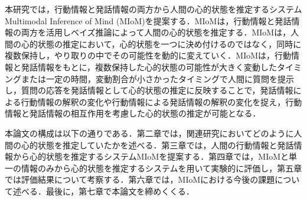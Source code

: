 \par
本研究では，行動情報と発話情報の両方から人間の心的状態を推定するシステムMultimodal Inference of Mind (MIoM)を提案する．MIoMは，行動情報と発話情報の両方を活用しベイズ推論によって人間の心的状態を推定する．MIoMは，人間の心的状態の推定において，心的状態を一つに決め付けるのではなく，同時に複数保持し，やり取りの中でその可能性を動的に変えていく．MIoMは，行動情報と発話情報をもとに，複数保持した心的状態の可能性が大きく変動したタイミングまたは一定の時間，変動割合が小さかったタイミングで人間に質問を提示し，質問の応答を発話情報として心的状態の推定に反映することで，発話情報による行動情報の解釈の変化や行動情報による発話情報の解釈の変化を捉え，行動情報と発話情報の相互作用を考慮した心的状態の推定が可能となる．

\par
本論文の構成は以下の通りである．第二章では，関連研究においてどのように人間の心的状態を推定していたかを述べる．第三章では，人間の行動情報と発話情報から心的状態を推定するシステムMIoMを提案する．第四章では，MIoMと単一の情報のみから心的状態を推定するシステムを用いて実験的に評価し，第五章では評価結果について考察する．第六章では，MIoMにおける今後の課題について述べる．最後に，第七章で本論文を締めくくる．
